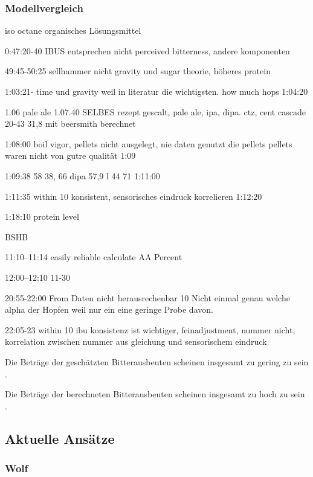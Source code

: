 \documentclass[a4paper,parskip=half]{scrartcl}
\begin{document}
\subsubsection*{Modellvergleich}

iso octane organisches Lösungsmittel

0:47:20-40
IBUS entsprechen nicht perceived bitterness, andere komponenten

49:45-50:25
sellhammer nicht gravity und sugar theorie, höheres protein

1:03:21- time und gravity weil in literatur
die wichtigsten. how much hops 1:04:20

1.06 pale ale 1.07.40
SELBES rezept gescalt, pale ale, ipa, dipa. ctz, cent cascade
20-43 31,8 mit beersmith berechnet

1:08:00 boil vigor, pellets nicht ausgelegt, nie daten genutzt die pellets
pellets waren nicht von gutre qualität 1:09

1:09:38 58
38, 66
dipa 57,9 l 44 71
1:11:00

1:11:35 within 10 %
konsistent, sensorisches eindruck korrelieren
1:12:20

1:18:10
protein level 
\parencite{Beechum2017a}

BSHB

11:10--11:14
easily reliable calculate AA Percent

12:00--12:10
11-30%

20:55-22:00
From Daten nicht herausrechenbar
10 %
Nicht einmal genau welche alpha der Hopfen weil nur ein eine geringe 
Probe davon.

22:05-23
within 10 ibu
konsistenz ist wichtiger, feinadjustment, nummer nicht,
korrelation zwischen nummer aus gleichung und sensorischem eindruck
\parencite{Smith2011}

Die Beträge der geschätzten
Bitterausbeuten scheinen insgesamt zu gering zu sein \parencite{Jones1995}.

Die Beträge
der berechneten Bitterausbeuten scheinen insgesamt zu hoch zu sein \parencite{Jones1995}.

\subsection*{Aktuelle Ansätze}

\subsubsection*{Wolf}
\end{document}
